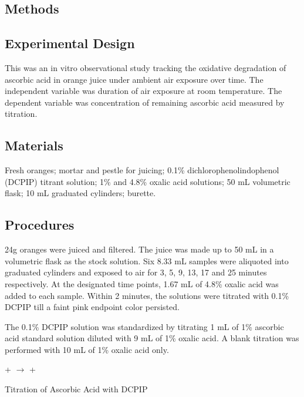 \documentclass[]{report}
\begin{document}
\begin{multicols}{2}
\section{Methods}
\subsection{Experimental Design}
This was an in vitro observational study tracking the oxidative degradation of ascorbic acid in orange juice under ambient air exposure over time. The independent variable was duration of air exposure at room temperature. The dependent variable was concentration of remaining ascorbic acid measured by titration.

\subsection{Materials}
Fresh oranges; mortar and pestle for juicing; 0.1\% dichlorophenolindophenol (DCPIP) titrant solution; 1\% and 4.8\% oxalic acid solutions; 50 mL volumetric flask; 10 mL graduated cylinders; burette.

\subsection{Procedures}
24g oranges were juiced and filtered. The juice was made up to 50 mL in a volumetric flask as the stock solution. Six 8.33 mL samples were aliquoted into graduated cylinders and exposed to air for 3, 5, 9, 13, 17 and 25 minutes respectively. At the designated time points, 1.67 mL of 4.8\% oxalic acid was added to each sample. Within 2 minutes, the solutions were titrated with 0.1\% DCPIP till a faint pink endpoint color persisted. 

The 0.1\% DCPIP solution was standardized by titrating 1 mL of 1\% ascorbic acid standard solution diluted with 9 mL of 1\% oxalic acid. A blank titration was performed with 10 mL of 1\% oxalic acid only.

\begin{scheme*}
    \centering
     +  $\rightarrow$  + 
    \caption{Titration of Ascorbic Acid with DCPIP}
    \label{sch:titration}
\end{scheme*}


\end{multicols}
\end{document}

